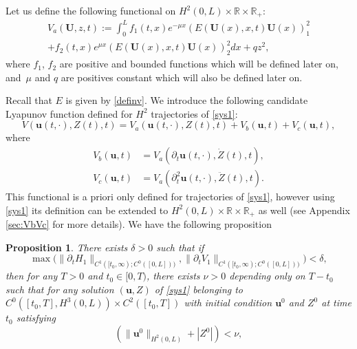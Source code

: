 \documentclass[11pt]{article}
\numberwithin{equation}{section}
\newtheorem{prop}[thm]{Proposition}
\theoremstyle{definition}
\begin{document}
Let {us} define the following functional on $H^{2}(0,L)\times\mathbb{R}\times\mathbb{R}_{+}$:
\begin{multline}
\label{Va}
V_{a}(\boldsymbol{U},z,t):=\int_{0}^{L}f_{1}(t,x)e^{-\mu x}(E(\boldsymbol{U}(x),x,t)\boldsymbol{U}{(x)})_{1}^{2}\\
+f_{2}(t,x)e^{\mu x}(E(\boldsymbol{U}(x),x,t)\boldsymbol{U}{(x)})_{2}^{2}dx+qz^{2},
\end{multline}
where $f_{1}$, $f_{2}$ are positive and bounded functions which will be defined later on, and~$\mu$ and $q$ are positives constant which will also be defined later on. {Recall that $E$ is given by \eqref{definv}. We introduce the following candidate Lyapunov function defined for $H^{2}$ trajectories of \eqref{sys1}:
\begin{equation}
\label{def-V-tot}
V(\boldsymbol{u}(t,\cdot),Z(t),t) = V_{a}(\boldsymbol{u}(t,\cdot),Z(t),t)+V_{b}(\boldsymbol{u},t)+V_{c}(\boldsymbol{u},t),
\end{equation}
where
\begin{equation}
\begin{split}
V_{b}(\boldsymbol{u},t) &= V_{a}(\partial_{t}\boldsymbol{u}(t,\cdot),\dot Z(t),t),\\
V_{c}(\boldsymbol{u},t) &= V_{a}(\partial_{t}^{2}\boldsymbol{u}(t,\cdot),\ddot Z(t),t).
\end{split}
\label{VbVc2}
\end{equation}
This functional is a priori only defined for trajectories of \eqref{sys1}, however using \eqref{sys1} its definition can be extended to $H^{2}(0,L)\times\mathbb{R}\times\mathbb{R}_{+}$ as well (see Appendix \ref{sec:VbVc} for more details). We have the following proposition
\begin{prop}
\label{propf1f2}
There exists $\delta>0$ such that if
\begin{equation*}
\max\bigl(\lVert\partial_{t}H_{1}\rVert_{C^{1}([t_{0},\infty);{C^{0}([0,L])})},\lVert\partial_{t}V_{1}\rVert_{C^{1}([t_{0},\infty);{C^{0}([0,L])})}\bigr)<\delta,
\end{equation*}
then for any $T>0$ and $t_{0}\in[0,T)$,
there exists $\nu>0$ {depending only on $T-t_{0}$}
such that for any solution $(\boldsymbol{u},Z)$ of \eqref{sys1} belonging to $C^{0}([t_{0},T],H^{3}(0,L))\times C^{2}([t_{0},T])$ with initial condition $\boldsymbol{u}^{0}$ and $Z^{0}$ at time $t_{0}$ satisfying
\begin{equation*}
\left(\lVert \boldsymbol{u}^{0}\rVert_{H^{2}(0,L)}+|Z^{0}|\right)<\nu,
\end{equation*}

\end{prop}}
\end{document}
